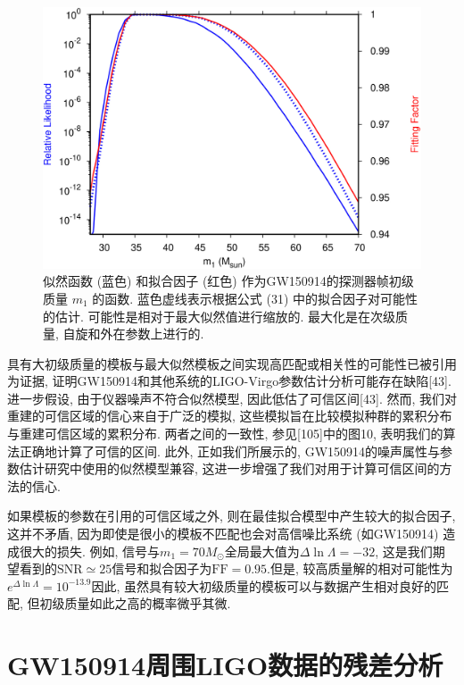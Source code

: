 \documentclass[a4paper]{\documentclassname}
\def\t{\text}
\theoremstyle{definition}
\begin{document}
\begin{figure}[htbp]
    \centering
    \includegraphics{img/16.jpg}
    \caption{
        似然函数 (蓝色) 和拟合因子 (红色) 作为GW150914的探测器帧初级质量 $m_1$ 的函数. 蓝色虚线表示根据公式  (31)  中的拟合因子对可能性的估计. 可能性是相对于最大似然值进行缩放的. 最大化是在次级质量, 自旋和外在参数上进行的. 
    }
\end{figure}

具有大初级质量的模板与最大似然模板之间实现高匹配或相关性的可能性已被引用为证据, 证明GW150914和其他系统的LIGO-Virgo参数估计分析可能存在缺陷[43]. 进一步假设, 由于仪器噪声不符合似然模型, 因此低估了可信区间[43]. 然而, 我们对重建的可信区域的信心来自于广泛的模拟, 这些模拟旨在比较模拟种群的累积分布与重建可信区域的累积分布. 两者之间的一致性, 参见[105]中的图10, 表明我们的算法正确地计算了可信的区间. 此外, 正如我们所展示的, GW150914的噪声属性与参数估计研究中使用的似然模型兼容, 这进一步增强了我们对用于计算可信区间的方法的信心. 

如果模板的参数在引用的可信区域之外, 则在最佳拟合模型中产生较大的拟合因子, 这并不矛盾, 因为即使是很小的模板不匹配也会对高信噪比系统 (如GW150914) 造成很大的损失. 例如, 信号与$m_1=70  M_\odot$全局最大值为$\Delta \ln {\Lambda} = -32$, 这是我们期望看到的$\t{SNR} \simeq 25$信号和拟合因子为$\t{FF}= 0.95$.但是, 较高质量解的相对可能性为$e^{\Delta \ln {\Lambda}}=10^{-13.9}$因此, 虽然具有较大初级质量的模板可以与数据产生相对良好的匹配, 但初级质量如此之高的概率微乎其微. 

\section{GW150914周围LIGO数据的残差分析}
\end{document}

